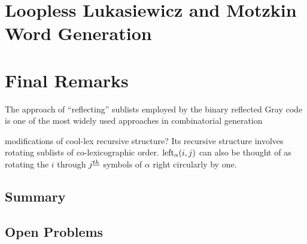 \chapter{Loopless Lukasiewicz and Motzkin Word Generation} \label{chap:luka-implementation}


\chapter{Final Remarks}
The approach of “reflecting” sublists employed by the binary reflected Gray code is one of the most widely used approaches in combinatorial generation

modifications of cool-lex recursive structure?
Its recursive structure involves rotating sublists of co-lexicographic order.  
$\lshiftindex[\alpha]{i}{j}$ can also be thought of as rotating the $i$ through $j\thh$ symbols of $\alpha$ right circularly by one.
\section{Summary}
\section{Open Problems}





